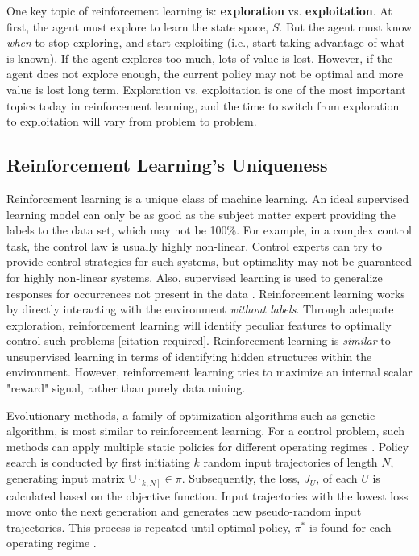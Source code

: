 One key topic of reinforcement learning is: \textbf{exploration} vs. \textbf{exploitation}.  At first, the agent must explore to learn the state space, $S$.  But the agent must know \textit{when} to stop exploring, and start exploiting (i.e., start taking advantage of what is known).  If the agent explores too much, lots of value is lost.  However, if the agent does not explore enough, the current policy may not be optimal and more value is lost long term.  Exploration vs. exploitation is one of the most important topics today in reinforcement learning, and the time to switch from exploration to exploitation will vary from problem to problem.

\subsection{Reinforcement Learning's Uniqueness}
Reinforcement learning is a unique class of machine learning.  An ideal supervised learning model can only be as good as the subject matter expert providing the labels to the data set, which may not be 100\%.  For example, in a complex control task, the control law is usually highly non-linear. Control experts can try to provide control strategies for such systems, but optimality may not be guaranteed for highly non-linear systems. Also, supervised learning is used to generalize responses for occurrences not present in the data \cite{sutton}.  Reinforcement learning works by directly interacting with the environment \textit{without labels}. Through adequate exploration, reinforcement learning will identify peculiar features to optimally control such problems [citation required].  Reinforcement learning is \textit{similar} to unsupervised learning in terms of identifying hidden structures within the environment.  However, reinforcement learning tries to maximize an internal scalar "reward" signal, rather than purely data mining.

Evolutionary methods, a family of optimization algorithms such as genetic algorithm, is most similar to reinforcement learning.  For a control problem, such methods can apply multiple static policies for different operating regimes \cite{sutton}.  Policy search is conducted by first initiating $k$ random input trajectories of length $N$, generating input matrix $\mathbb{U}_{[k, N]} \in \pi$.  Subsequently, the loss, $J_U$, of each $U$ is calculated based on the objective function.  Input trajectories with the lowest loss move onto the next generation and generates new pseudo-random input trajectories.  This process is repeated until optimal policy, $\pi^*$ is found for each operating regime \cite{ga_for_control}.

